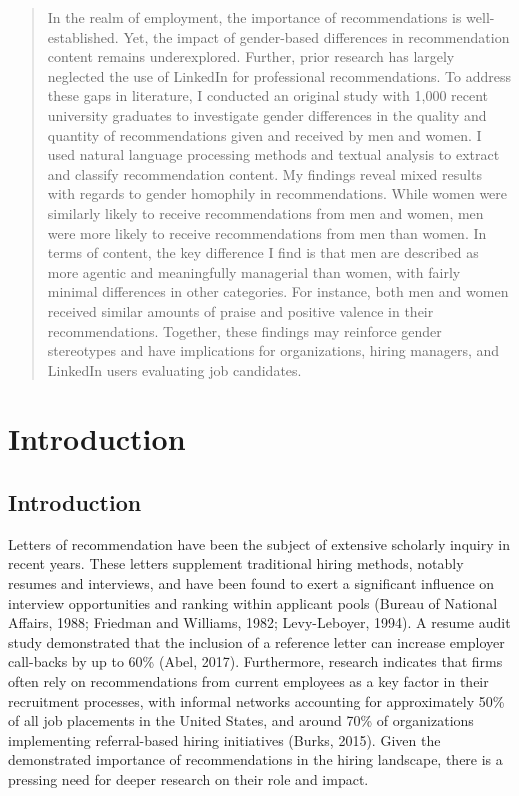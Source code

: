 \documentclass[12pt]{caltech_thesis}
\begin{document}
\begin{abstract}
   In the realm of employment, the importance of recommendations is well-established. Yet, the impact of gender-based differences in recommendation content remains underexplored. Further, prior research has largely neglected the use of LinkedIn for professional recommendations. To address these gaps in literature, I conducted an original study with 1,000 recent university graduates to investigate gender differences in the quality and quantity of recommendations given and received by men and women. I used natural language processing methods and textual analysis to extract and classify recommendation content. My findings reveal mixed results with regards to gender homophily in recommendations. While women were similarly likely to receive recommendations from men and women, men were more likely to receive recommendations from men than women. In terms of content, the key difference I find is that men are described as more agentic and meaningfully managerial than women, with fairly minimal differences in other categories. For instance, both men and women received similar amounts of praise and positive valence in their recommendations. Together, these findings may reinforce gender stereotypes and have implications for organizations, hiring managers, and LinkedIn users evaluating job candidates.
\end{abstract}

\begin{publishedcontent}%
\nocite{Cahn:etal:2015,Cahn:etal:2016}
\end{publishedcontent}

\printnomenclature

\mainmatter


\chapter{Introduction}

\section{Introduction}
Letters of recommendation have been the subject of extensive scholarly inquiry in recent years.  These letters supplement traditional hiring methods, notably resumes and interviews, and have been found to exert a significant influence on interview opportunities and ranking within applicant pools (Bureau of National Affairs, 1988; Friedman and Williams, 1982; Levy-Leboyer, 1994). A resume audit study demonstrated that the inclusion of a reference letter can increase employer call-backs by up to 60\% (Abel, 2017). Furthermore, research indicates that firms often rely on recommendations from current employees as a key factor in their recruitment processes, with informal networks accounting for approximately 50\% of all job placements in the United States, and around 70\% of organizations implementing referral-based hiring initiatives (Burks, 2015). Given the demonstrated importance of recommendations in the hiring landscape, there is a pressing need for deeper research on their role and impact.
\end{document}

